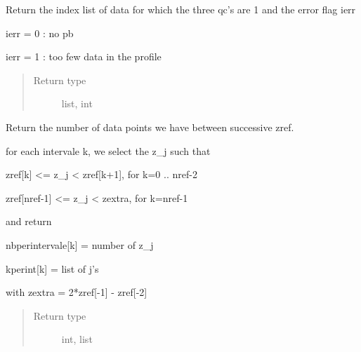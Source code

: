 \documentclass[letterpaper,10pt,english]{sphinxmanual}
\begin{document}
\begin{fulllineitems}
\label{\detokenize{pargopy:pargopy.interpolation_tools.remove_bad_qc}}
Return the index list of data for which the three qc’s are 1
and the error flag ierr

ierr = 0 : no pb

ierr = 1 : too few data in the profile
\begin{quote}\begin{description}
\item[{Return type}] \leavevmode
list, int

\end{description}\end{quote}

\end{fulllineitems}


\begin{fulllineitems}
\label{\detokenize{pargopy:pargopy.interpolation_tools.select_depth}}
Return the number of data points we have between successive zref.

for each intervale k, we select the z\_j such that

zref{[}k{]} \textless{}= z\_j \textless{} zref{[}k+1{]}, for k=0 .. nref-2

zref{[}nref-1{]} \textless{}= z\_j \textless{} zextra, for k=nref-1

and return

nbperintervale{[}k{]} = number of z\_j

kperint{[}k{]} = list of j’s

with zextra = 2*zref{[}-1{]} - zref{[}-2{]}
\begin{quote}\begin{description}
\item[{Return type}] \leavevmode
int, list

\end{description}\end{quote}

\end{fulllineitems}
\end{document}

